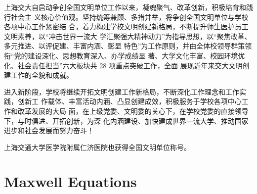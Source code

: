 \documentclass{sjtureport}
\begin{document}
上海交大自启动争创全国文明单位工作以来，凝魂聚气、改革创新，积极培育和践行社会主
义核心价值观。坚持统筹兼顾、多措并举，将争创全国文明单位与学校各项中心工作紧密结
合，着力构建学校文明创建新格局，不断提升师生医护员工文明素养，以“冲击世界一流大
学汇聚强大精神动力”为指导思想，以“聚焦改革、多元推进、以评促建、丰富内涵、彰显
特色”为工作原则，并由全体校领导群策领衔“党的建设深化、思想教育深入、办学成绩显
著、大学文化丰富、校园环境优化、社会责任担当”六大板块共 28 项重点突破工作，全面
展现近年来交大文明创建工作的全貌和成就。

进入新阶段，学校将继续开拓文明创建工作新格局，不断深化工作理念和工作实践，创新工
作载体、丰富活动内涵、凸显创建成效，积极服务于学校各项中心工作和改革发展的大局
面，在上级党委、文明委的关心下，在学校党委的直接领导下，与时俱进、开拓创新，为深
化内涵建设、加快建成世界一流大学、推动国家进步和社会发展而努力奋斗！

上海交通大学医学院附属仁济医院也获得全国文明单位称号。


\nocite{*}
\printbibliography[heading=bibintoc]

\appendix
\captionsetup{list=no} %

\chapter{Maxwell Equations}
\end{document}
